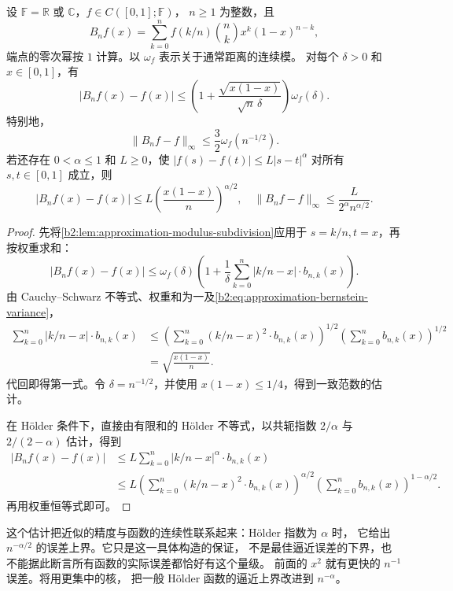 \begin{proposition}
\label{b2:prop:approximation-bernstein-modulus}
设 \(\mathbb F=\mathbb R\) 或 \(\mathbb C\)，\(f\in C([0,1];\mathbb F)\)，
\(n\geq1\) 为整数，且
\[
 B_nf(x)=\sum_{k=0}^nf(k/n)\binom nk x^k(1-x)^{n-k},
\]
端点的零次幂按 \(1\) 计算。以 \(\omega_f\) 表示关于通常距离的连续模。
对每个 \(\delta>0\) 和 \(x\in[0,1]\)，有
\[
 |B_nf(x)-f(x)|
 \leq\left(1+\frac{\sqrt{x(1-x)}}{\sqrt n\,\delta}\right)\omega_f(\delta).
\]
特别地，
\[
 \lVert B_nf-f\rVert_\infty\leq\frac32\omega_f(n^{-1/2}).
\]
若还存在 \(0<\alpha\leq1\) 和 \(L\geq0\)，使
\(|f(s)-f(t)|\leq L|s-t|^\alpha\) 对所有 \(s,t\in[0,1]\) 成立，则
\[
 |B_nf(x)-f(x)|\leq L\left(\frac{x(1-x)}n\right)^{\alpha/2},\quad
 \lVert B_nf-f\rVert_\infty\leq\frac{L}{2^\alpha n^{\alpha/2}}.
\]
\end{proposition}
\begin{proof}
先将\cref{b2:lem:approximation-modulus-subdivision}应用于 \(s=k/n,t=x\)，再按权重求和：
\[
 |B_nf(x)-f(x)|
 \leq\omega_f(\delta)\left(1+\frac1\delta
       \sum_{k=0}^n|k/n-x|\cdot b_{n,k}(x)\right).
\]
由 Cauchy--Schwarz 不等式、权重和为一及\eqref{b2:eq:approximation-bernstein-variance}，
\[
 \begin{aligned}
 \sum_{k=0}^n|k/n-x|\cdot b_{n,k}(x)
 &\leq\left(\sum_{k=0}^n(k/n-x)^2\cdot b_{n,k}(x)\right)^{1/2}
       \left(\sum_{k=0}^nb_{n,k}(x)\right)^{1/2}\\
 &=\sqrt{\frac{x(1-x)}n}.
 \end{aligned}
\]
代回即得第一式。令 \(\delta=n^{-1/2}\)，并使用 \(x(1-x)\leq1/4\)，得到一致范数的估计。

在 Hölder 条件下，直接由有限和的 Hölder 不等式，以共轭指数
\(2/\alpha\) 与 \(2/(2-\alpha)\) 估计，得到
\[
 \begin{aligned}
 |B_nf(x)-f(x)|
 &\leq L\sum_{k=0}^n|k/n-x|^\alpha\cdot b_{n,k}(x)\\
 &\leq L\left(\sum_{k=0}^n(k/n-x)^2\cdot b_{n,k}(x)\right)^{\alpha/2}
       \left(\sum_{k=0}^nb_{n,k}(x)\right)^{1-\alpha/2}.
 \end{aligned}
\]
再用权重恒等式即可。
\end{proof}

这个估计把近似的精度与函数的连续性联系起来：Hölder 指数为 \(\alpha\) 时，
它给出 \(n^{-\alpha/2}\) 的误差上界。它只是这一具体构造的保证，
不是最佳逼近误差的下界，也不能据此断言所有函数的实际误差都恰好有这个量级。
前面的 \(x^2\) 就有更快的 \(n^{-1}\) 误差。将用更集中的核，
把一般 Hölder 函数的逼近上界改进到 \(n^{-\alpha}\)。

